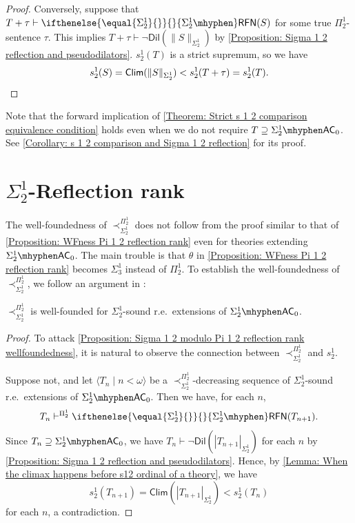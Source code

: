 \documentclass{mhkr}
\newcommand{\lag}{\langle}
\newcommand{\rag}{\rangle}
\newcommand{\Clim}{\mathsf{Clim}}
\newcommand{\Dil}{\mathsf{Dil}}
\newcommand{\RFN}[1][]{\ifthenelse{\equal{#1}{}}{}{#1\mhyphen}\mathsf{RFN}}
\newcommand{\AC}{\mathsf{AC}}
\begin{document}
{\begin{proof}
    Conversely, suppose that $T + \tau\vdash \RFN[\Sigma^1_2](S)$ for some true $\Pi^1_2$-sentence $\tau$. This implies $T + \tau\vdash \lnot\Dil(\|S\|_{\Sigma^1_2})$ by \autoref{Proposition: Sigma 1 2 reflection and pseudodilators}. $s^1_2(T)$ is a strict supremum, so we have 
    \begin{equation*}
        s^1_2(S) = \Clim(\|S\|_{\Sigma^1_2}) < s^1_2(T+\tau) = s^1_2(T). \qedhere 
    \end{equation*}
\end{proof}
Note that the forward implication of \autoref{Theorem: Strict s 1 2 comparison equivalence condition} holds even when we do not require $T\supseteq \Sigma^1_2\mhyphen\AC_0$. See \autoref{Corollary: s 1 2 comparison and Sigma 1 2 reflection} for its proof.
}

\section{\texorpdfstring{$\Sigma^1_2$}{Sigma 1 2}-Reflection rank}
\label{Section: Sigma 1 2 reflection rank}
The well-foundedness of $\prec^{\Pi^1_2}_{\Sigma^1_2}$ does not follow from the proof similar to that of \autoref{Proposition: WFness Pi 1 2 reflection rank} even for theories extending $\Sigma^1_2\mhyphen\AC_0$. The main trouble is that $\theta$ in \autoref{Proposition: WFness Pi 1 2 reflection rank} becomes $\Sigma^1_3$ instead of $\Pi^1_2$.
To establish the well-foundedness of $\prec^{\Pi^1_2}_{\Sigma^1_2}$, we follow an argument in \cite{Walsh2022incompleteness}:

\begin{proposition} \label{Proposition: Sigma 1 2 modulo Pi 1 2 reflection rank wellfoundedness}
    $\prec^{\Pi^1_2}_{\Sigma^1_2}$ is well-founded for $\Sigma^1_2$-sound r.e.\ extensions of $\Sigma^1_2\mhyphen \AC_0$.
\end{proposition}
\begin{proof}
    To attack \autoref{Proposition: Sigma 1 2 modulo Pi 1 2 reflection rank wellfoundedness}, it is natural to observe the connection between $\prec^{\Pi^1_2}_{\Sigma^1_2}$ and $s^1_2$.

    Suppose not, and let $\lag T_n\mid n<\omega\rag$ be a $\prec^{\Pi^1_2}_{\Sigma^1_2}$-decreasing sequence of $\Sigma^1_2$-sound r.e.\ extensions of $\Sigma^1_2\mhyphen\AC_0$.
    Then we have, for each $n$,
    \begin{equation*}
        T_n \vdash^{\Pi^1_2} \RFN[\Sigma^1_2](T_{n+1}).
    \end{equation*}
    Since $T_n\supseteq \Sigma^1_2\mhyphen\AC_0$, we have $T_n\vdash\lnot\Dil(|T_{n+1}|_{\Sigma^1_2})$ for each $n$ by \autoref{Proposition: Sigma 1 2 reflection and pseudodilators}.
    Hence, by \autoref{Lemma: When the climax happens before s12 ordinal of a theory}, we have
    \begin{equation*}
        s^1_2(T_{n+1}) = \Clim(|T_{n+1}|_{\Sigma^1_2}) < s^1_2(T_n)
    \end{equation*}
    for each $n$, a contradiction.
\end{proof}
\end{document}
